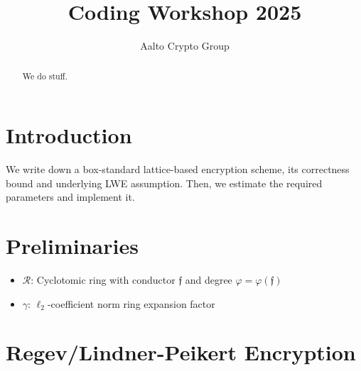 \documentclass[a4paper,10pt]{article}
\title{Coding Workshop 2025}
\author{Aalto Crypto Group}
\newcommand{\ring}{\mathcal{R}}
\newcommand{\conductor}{\mathfrak{f}}
\begin{document}
\maketitle

\begin{abstract}
  We do stuff.
\end{abstract}

\section{Introduction}

We write down a box-standard lattice-based encryption scheme, its correctness bound and underlying LWE assumption.
Then, we estimate the required parameters and implement it.

\section{Preliminaries}

\begin{itemize}
  \item $\ring$: Cyclotomic ring with conductor $\conductor$ and degree $\varphi = \varphi(\conductor)$
  \item $\gamma$: $\ell_2$-coefficient norm ring expansion factor 
\end{itemize}

\section{Regev/Lindner-Peikert Encryption}
\end{document}
